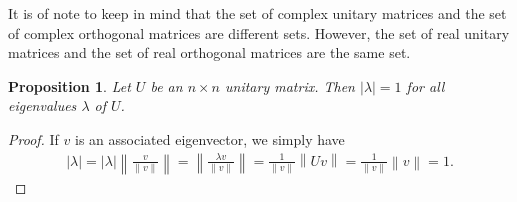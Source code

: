 \documentclass[15pt,a4paper]{book}
\newtheorem{proposition}[theorem]{Proposition}
\theoremstyle{definition}
\newcommand{\abs}[1]{\left| #1 \right|} %
\newcommand{\norm}[1]{\left\lVert#1\right\rVert}
\begin{document}
It is of note to keep in mind that the set of complex unitary matrices and the set of complex orthogonal matrices are different sets. However, the set of real unitary matrices and the set of real orthogonal matrices are the same set.

\begin{proposition}
    Let $U$ be an $n \times n$ unitary matrix. Then $\abs{\lambda} = 1$ for all eigenvalues $\lambda$ of $U$.
\end{proposition}
\begin{proof}
    If $v$ is an associated eigenvector, we simply have
    \begin{align}
        \abs{\lambda} = \abs{\lambda} \norm{\frac{v}{\norm{v}}} = \norm{\frac{\lambda v}{\norm{v}}} = \frac{1}{\norm{v}} \norm{Uv} = \frac{1}{\norm{v}}\norm{v} = 1.
    \end{align}
\end{proof}
\end{document}

